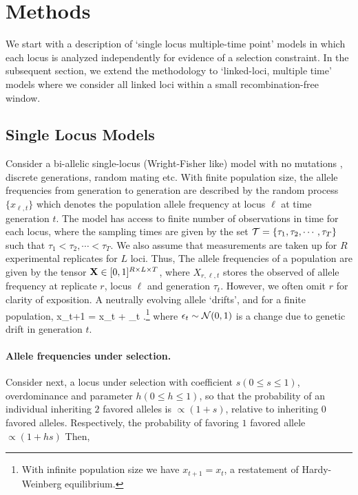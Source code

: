 \section{Methods}
We start with a description of `single locus multiple-time point'
models in which each locus is analyzed independently for evidence of a
selection constraint. In the subsequent section, we extend the
methodology to `linked-loci, multiple time' models where we consider
all linked loci within a small recombination-free window.

\subsection*{Single Locus Models}
Consider a bi-allelic single-locus (Wright-Fisher like) model with no
mutations \cite{Ewens2012}, discrete generations, random mating
etc. With finite population size, the allele frequencies from
generation to generation are described by the random process
$\{x_{\ell,t}\}$ which denotes the population allele frequency at
locus $\ell$ at time generation $t$. The model has access to finite
number of observations in time for each locus, where the sampling
times are given by the set ${\cal T}=\{\tau_1,\tau_2,\cdots, \tau_T \}$
such that $\tau_1<\tau_2,\cdots<\tau_T$. We also assume that
measurements are taken up for $R$ experimental replicates for $L$
loci. Thus, The allele frequencies of a population are given by the
tensor ${\mathbf X} \in [0,1]^{R \times L \times T}$, where $X_{r,\ell,t}$
stores the observed of allele frequency at replicate $r$, locus $\ell$
and generation $\tau_t$. However, we often omit $r$ for clarity of
exposition. A neutrally evolving allele `drifts', and for a finite
population,
\beq x_{t+1} = x_t + \epsilon_t\; .\footnote{With infinite population size
  we have $x_{t+1} = x_t$, a restatement of Hardy-Weinberg
  equilibrium.}
\label{eq:drift}
\eeq where $\epsilon_t \sim {\cal N}(0,1)$ is a change due to genetic drift
in generation $t$.

\paragraph{Allele frequencies under selection.}
Consider next, a locus under selection with coefficient $s (0\le s\le
1)$, overdominance and parameter $h (0\le h\le 1)$, so that the
probability of an individual inheriting $2$ favored alleles is
$\propto (1+s)$, relative to inheriting $0$ favored
alleles. Respectively, the probability of favoring $1$ favored allele
$\propto (1+hs)$ Then,


